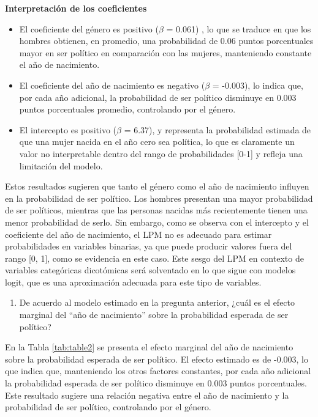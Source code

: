 \documentclass[
  12pt,
  a4paper,
]{article}
\providecommand{\tightlist}{%
  \setlength{\itemsep}{0pt}\setlength{\parskip}{0pt}}
\begin{document}
\textbf{Interpretación de los coeficientes}

\begin{itemize}
\item
  El coeficiente del género es positivo (\(\beta\) = 0.061) , lo que se traduce en que los hombres obtienen, en promedio, una probabilidad de 0.06 puntos porcentuales mayor en ser político en comparación con las mujeres, manteniendo constante el año de nacimiento.
\item
  El coeficiente del año de nacimiento es negativo (\(\beta\) = -0.003), lo indica que, por cada año adicional, la probabilidad de ser político disminuye en 0.003 puntos porcentuales promedio, controlando por el género.
\item
  El intercepto es positivo (\(\beta\) = 6.37), y representa la probabilidad estimada de que una mujer nacida en el año cero sea política, lo que es claramente un valor no interpretable dentro del rango de probabilidades {[}0-1{]} y refleja una limitación del modelo.
\end{itemize}

Estos resultados sugieren que tanto el género como el año de nacimiento influyen en la probabilidad de ser político. Los hombres presentan una mayor probabilidad de ser políticos, mientras que las personas nacidas más recientemente tienen una menor probabilidad de serlo. Sin embargo, como se observa con el intercepto y el coeficiente del año de nacimiento, el LPM no es adecuado para estimar probabilidades en variables binarias, ya que puede producir valores fuera del rango {[}0, 1{]}, como se evidencia en este caso. Este sesgo del LPM en contexto de variables categóricas dicotómicas será solventado en lo que sigue con modelos logit, que es una aproximación adecuada para este tipo de variables.

\begin{enumerate}
\def\labelenumi{\arabic{enumi}.}
\setcounter{enumi}{3}
\tightlist
\item
  De acuerdo al modelo estimado en la pregunta anterior, ¿cuál es el efecto marginal del ``año de nacimiento'' sobre la probabilidad esperada de ser político?
\end{enumerate}

En la Tabla \ref{tab:table2} se presenta el efecto marginal del año de nacimiento sobre la probabilidad esperada de ser político. El efecto estimado es de -0.003, lo que indica que, manteniendo los otros factores constantes, por cada año adicional la probabilidad esperada de ser político disminuye en 0.003 puntos porcentuales. Este resultado sugiere una relación negativa entre el año de nacimiento y la probabilidad de ser político, controlando por el género.
\end{document}
